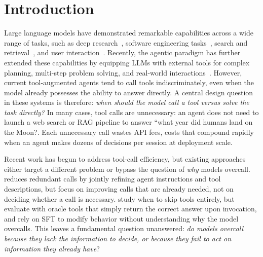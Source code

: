 \section{Introduction}
\label{sec:intro}

Large language models have demonstrated remarkable capabilities across a wide range of tasks, such as deep research~\citep{shao2025dr, openai2025deep}, software engineering tasks~\citep{jimenez2023swe, liu2025migrationbench, merrill2026terminal}, search and retrieval~\citep{jin2025search}, and user interaction~\citep{yao2024tau, barres2025tau}. Recently, the agentic paradigm has further extended these capabilities by equipping LLMs with external tools for complex planning, multi-step problem solving, and real-world interactions~\citep{schick2023toolformer, qin2023toolllm, patil2024gorilla}. However, current tool-augmented agents tend to call tools indiscriminately, even when the model already possesses the ability to answer directly. A central design question in these systems is therefore: \emph{when should the model call a tool versus solve the task directly?} In many cases, tool calls are unnecessary: an agent does not need to launch a web search or RAG pipeline to answer ``what year did humans land on the Moon?. Each unnecessary call wastes API fees, costs that compound rapidly when an agent makes dozens of decisions per session at deployment scale.

Recent work has begun to address tool-call efficiency, but existing approaches either target a different problem or bypass the question of \emph{why} models overcall. \citet{wu2025joint} reduces redundant calls by jointly refining agent instructions and tool descriptions, but focus on improving calls that are already needed, not on deciding whether a call is necessary. \citet{xu2025alignment} study when to skip tools entirely, but evaluate with oracle tools that simply return the correct answer upon invocation, and rely on SFT to modify behavior without understanding why the model overcalls. This leaves a fundamental question unanswered: \textit{do models overcall because they lack the information to decide, or because they fail to act on information they already have}?

